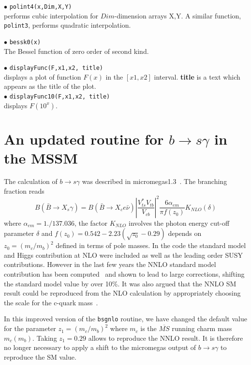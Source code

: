 \documentclass[12pt,a4paper]{article}
\begin{document}
\noindent$\bullet$ \verb|polint4(x,Dim,X,Y)|\\
performs   cubic interpolation for $Dim$-dimension arrays X,Y. A similar 
 function, \verb|polint3|, performs quadratic interpolation.

\noindent$\bullet$ \verb|bessk0(x)|\\ 
The Bessel function of zero order of second kind. 


\noindent$\bullet$ \verb|displayFunc(F,x1,x2, title)|\\
displays a plot of function $F(x)$ in the  $[x1,x2]$ interval. {\bf title} is a text 
which appears as the title of the plot. \\
\noindent$\bullet$ \verb|displayFunc10(F,x1,x2, title)|\\
displays $F(10^x)$.



\appendix
\section{An updated routine for $b\rightarrow s\gamma$ in the MSSM}
The calculation of $b\rightarrow s\gamma$ was described in micromegas1.3~\cite{Belanger:2004yn}. 
The branching fraction reads
\begin{equation}
B(\bar{B}\rightarrow X_s \gamma) =B(\bar{B}\rightarrow X_c e\bar\nu) \left|\frac{V_{ts}^* V_{tb}}
{V_{cb}}\right|^2 \frac{6\alpha_{em}}{\pi f(z_0)} K_{NLO}(\delta)
\label{eq:bsg}
\end{equation}
where $\alpha_{em}=1./137.036$, the factor $K_{NLO}$ involves the photon energy cut-off parameter
$\delta$ and $f(z_0)=0.542-2.23(\sqrt{z_0} -0.29)$ depends on $z_0=(m_c/m_b)^2$ defined in terms of pole
masses.  
In the code 
the standard model and Higgs contribution at NLO were included as well as the leading order SUSY
contributions. However in the last few years
 the NNLO standard model contribution has been computed~\cite{Misiak:2006zs} and shown to lead to large corrections, shifting
 the standard model value by over 10\%. 
 It was also argued that the NNLO SM result could be reproduced from
 the NLO calculation by appropriately choosing the scale for the c-quark mass~\cite{Misiak:2006ab,Gambino:2008fj}. 



 In this improved version of the {\tt bsgnlo} routine, we 
 have changed the default value for the parameter $z_1=(m_c/m_b)^2$
 where $m_c$ is the $\overline{MS}$ running charm mass $m_c(m_b)$. Taking $z_1=0.29$ allows 
 to reproduce the NNLO result. 
 It is therefore no longer necessary to apply a shift to  the micromegas output of $b\rightarrow s\gamma$
 to reproduce the SM value. 
\end{document}
